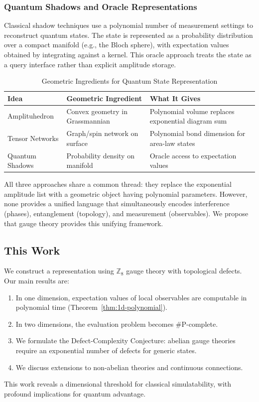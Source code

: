 \subsubsection{Quantum Shadows and Oracle Representations}

Classical shadow techniques use a polynomial number of measurement settings to reconstruct quantum states. The state is represented as a probability distribution over a compact manifold (e.g., the Bloch sphere), with expectation values obtained by integrating against a kernel. This oracle approach treats the state as a query interface rather than explicit amplitude storage.

\begin{table}[h]
\centering
\caption{Geometric Ingredients for Quantum State Representation}
\begin{tabular}{|l|l|l|}
\hline
\textbf{Idea} & \textbf{Geometric Ingredient} & \textbf{What It Gives} \\
\hline
Amplituhedron & Convex geometry in Grassmannian & Polynomial volume replaces exponential diagram sum \\
\hline
Tensor Networks & Graph/spin network on surface & Polynomial bond dimension for area-law states \\
\hline
Quantum Shadows & Probability density on manifold & Oracle access to expectation values \\
\hline
\end{tabular}
\end{table}

All three approaches share a common thread: they replace the exponential amplitude list with a geometric object having polynomial parameters. However, none provides a unified language that simultaneously encodes interference (phases), entanglement (topology), and measurement (observables). We propose that gauge theory provides this unifying framework.

\subsection{This Work}

We construct a representation using $\mathbb{Z}_8$ gauge theory with topological defects. Our main results are:

\begin{enumerate}
    \item In one dimension, expectation values of local observables are computable in polynomial time (Theorem~\ref{thm:1d-polynomial}).
    \item In two dimensions, the evaluation problem becomes \#P-complete.
    \item We formulate the Defect-Complexity Conjecture: abelian gauge theories require an exponential number of defects for generic states.
    \item We discuss extensions to non-abelian theories and continuous connections.
\end{enumerate}

This work reveals a dimensional threshold for classical simulatability, with profound implications for quantum advantage.
